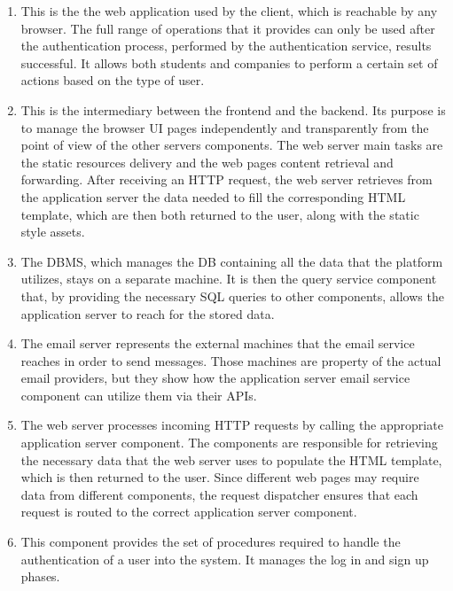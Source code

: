 \begin{enumerate}[label=\textbf{C\arabic* -}]

\item {}
This is the the web application used by the client, which is reachable by any browser.
The full range of operations that it provides can only be used after the authentication process, performed by the authentication service, results successful.
It allows both students and companies to perform a certain set of actions based on the type of user.

\item {}
This is the intermediary between the frontend and the backend.
Its purpose is to manage the browser UI pages independently and transparently from the point of view of the other servers components.
The web server main tasks are the static resources delivery and the web pages content retrieval and forwarding.
After receiving an HTTP request, the web server retrieves from the application server the data needed to fill the corresponding HTML template, which are then both returned to the user, along with the static style assets.

\item {}
The DBMS, which manages the DB containing all the data that the platform utilizes, stays on a separate machine.
It is then the query service component that, by providing the necessary SQL queries to other components, allows the application server to reach for the stored data.

\item {}
The email server represents the external machines that the email service reaches in order to send messages.
Those machines are property of the actual email providers, but they show how the application server email service component can utilize them via their APIs.

\item {}
The web server processes incoming HTTP requests by calling the appropriate application server component.
The components are responsible for retrieving the necessary data that the web server uses to populate the HTML template, which is then returned to the user.
Since different web pages may require data from different components, the request dispatcher ensures that each request is routed to the correct application server component.

\item {}
This component provides the set of procedures required to handle the authentication of a user into the system.
It manages the log in and sign up phases.


\end{enumerate}
